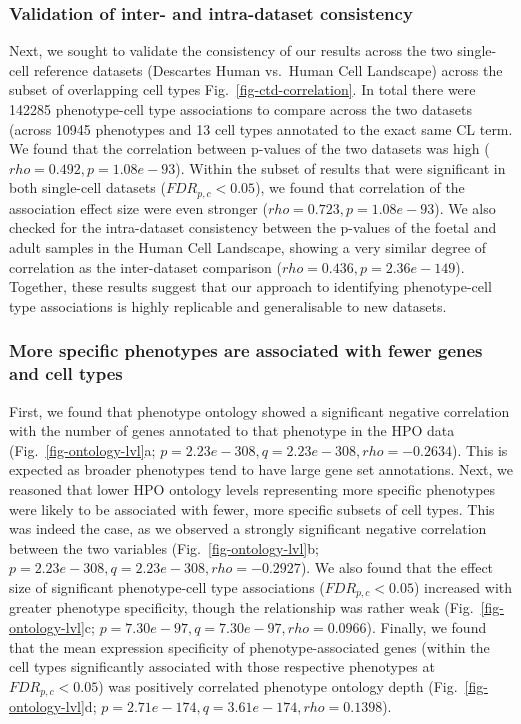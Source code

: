 \documentclass[
sn-nature
]{sn-jnl}
\begin{document}
\subsubsection{Validation of inter- and intra-dataset
consistency}\label{validation-of-inter--and-intra-dataset-consistency}

Next, we sought to validate the consistency of our results across the
two single-cell reference datasets (Descartes Human vs.~Human Cell
Landscape) across the subset of overlapping cell types
Fig.~\ref{fig-ctd-correlation}. In total there were 142285
phenotype-cell type associations to compare across the two datasets
(across 10945 phenotypes and 13 cell types annotated to the exact same
CL term. We found that the correlation between p-values of the two
datasets was high (\(rho=0.492, p=1.08e-93\)). Within the subset of
results that were significant in both single-cell datasets
(\(FDR_{p,c}<0.05\)), we found that correlation of the association
effect size were even stronger (\(rho=0.723, p=1.08e-93\)). We also
checked for the intra-dataset consistency between the p-values of the
foetal and adult samples in the Human Cell Landscape, showing a very
similar degree of correlation as the inter-dataset comparison
(\(rho=0.436, p=2.36e-149\)). Together, these results suggest that our
approach to identifying phenotype-cell type associations is highly
replicable and generalisable to new datasets.

\subsubsection{More specific phenotypes are associated with fewer genes
and cell
types}\label{more-specific-phenotypes-are-associated-with-fewer-genes-and-cell-types}

First, we found that phenotype ontology showed a significant negative
correlation with the number of genes annotated to that phenotype in the
HPO data (Fig.~\ref{fig-ontology-lvl}a;
\(p=2.23e-308, q=2.23e-308, rho=-0.2634\)). This is expected as broader
phenotypes tend to have large gene set annotations. Next, we reasoned
that lower HPO ontology levels representing more specific phenotypes
were likely to be associated with fewer, more specific subsets of cell
types. This was indeed the case, as we observed a strongly significant
negative correlation between the two variables
(Fig.~\ref{fig-ontology-lvl}b;
\(p=2.23e-308, q=2.23e-308, rho=-0.2927\)). We also found that the
effect size of significant phenotype-cell type associations
(\(FDR_{p,c}<0.05\)) increased with greater phenotype specificity,
though the relationship was rather weak (Fig.~\ref{fig-ontology-lvl}c;
\(p=7.30e-97, q=7.30e-97, rho=0.0966\)). Finally, we found that the mean
expression specificity of phenotype-associated genes (within the cell
types significantly associated with those respective phenotypes at
\(FDR_{p,c}<0.05\)) was positively correlated phenotype ontology depth
(Fig.~\ref{fig-ontology-lvl}d;
\(p=2.71e-174, q=3.61e-174, rho=0.1398\)).
\end{document}
